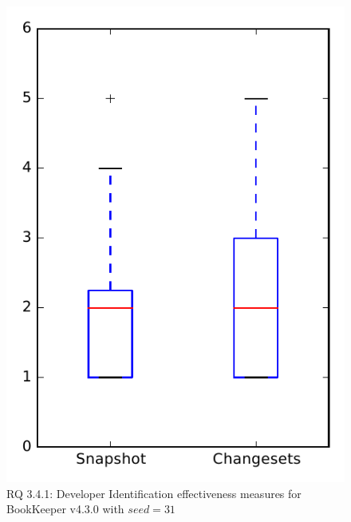 
\begin{figure}
\centering
\includegraphics[height=0.4\textheight]{figures/dit_seed/rq1_bookkeeper_31}
\caption{RQ 3.4.1: Developer Identification effectiveness measures for BookKeeper v4.3.0 with $seed=31$}
\label{fig:dit_seed:rq1:bookkeeper}
\end{figure}
